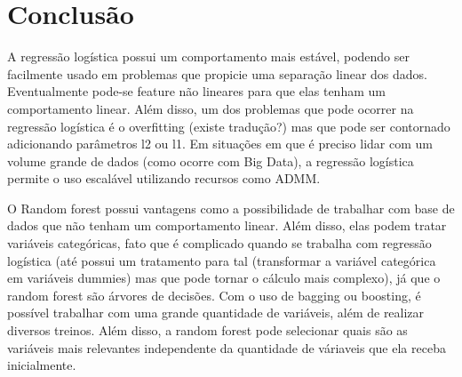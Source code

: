 \chapter{Conclusão}
A regressão logística possui um comportamento mais estável, podendo ser facilmente usado em problemas que propicie uma separação linear dos dados. Eventualmente pode-se feature não lineares para que elas tenham um comportamento linear. Além disso, um dos problemas que pode ocorrer na regressão logística é o overfitting (existe tradução?) mas que pode ser contornado adicionando parâmetros l2 ou l1. Em situações em que é preciso lidar com um volume grande de dados (como ocorre com Big Data), a regressão logística permite o uso escalável utilizando recursos como ADMM. 

O Random forest possui vantagens como a possibilidade de trabalhar com base de dados que não tenham um comportamento linear. Além disso, elas podem tratar variáveis categóricas, fato que é complicado quando se trabalha com regressão logística (até possui um tratamento para tal (transformar a variável categórica em variáveis dummies) mas que pode tornar o cálculo mais complexo), já que o random forest são árvores de decisões. Com o uso de bagging ou boosting, é possível trabalhar com uma grande quantidade de variáveis, além de realizar diversos treinos. Além disso, a random forest pode selecionar quais são as variáveis mais relevantes independente da quantidade de váriaveis que ela receba inicialmente.





